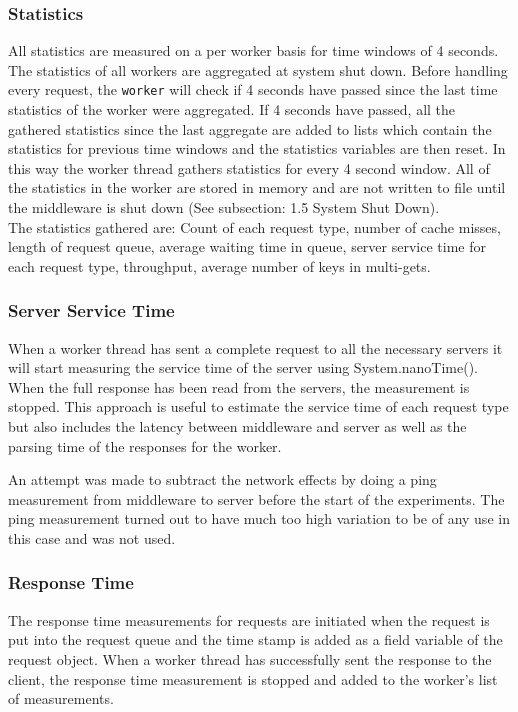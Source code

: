 \documentclass[11pt,a4paper]{article}
\begin{document}
\subsubsection{Statistics}
All statistics are measured on a per worker basis for time windows of 4 seconds. The statistics of all workers are aggregated at system shut down. Before handling every request, the \texttt{worker} will check if 4 seconds have passed since the last time statistics of the worker were aggregated. If 4 seconds have passed, all the gathered statistics since the last aggregate are added to lists which contain the statistics for previous time windows and the statistics variables are then reset. In this way the worker thread gathers statistics for every 4 second window. All of the statistics in the worker are stored in memory and are not written to file until the middleware is shut down (See subsection: 1.5 System Shut Down).\\

The statistics gathered are: Count of each request type, number of cache misses, length of request queue, average waiting time in queue, server service time for each request type, throughput, average number of keys in multi-gets.

\subsubsection{Server Service Time}
When a worker thread has sent a complete request to all the necessary servers it will start measuring the service time of the server using System.nanoTime(). When the full response has been read from the servers, the measurement is stopped. This approach is useful to estimate the service time of each request type but also includes the latency between middleware and server as well as the parsing time of the responses for the worker. 

An attempt was made to subtract the network effects by doing a ping measurement from middleware to server before the start of the experiments. The ping measurement turned out to have much too high variation to be of any use in this case and was not used.

\subsubsection{Response Time}
The response time measurements for requests are initiated when the request is put into the request queue and the time stamp is added as a field variable of the request object. When a worker thread has successfully sent the response to the client, the response time measurement is stopped and added to the worker's list of measurements.
\end{document}
